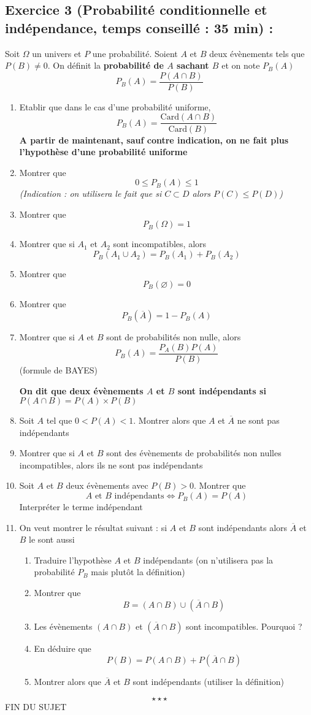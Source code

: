 \subsection*{Exercice 3 (Probabilité conditionnelle et indépendance, temps conseillé : 35 min) : }
Soit $\Omega$ un univers et $P$ une probabilité. Soient $A$ et $B$ deux évènements tels que $P(B) \neq 0$. On définit la \textbf{probabilité de $A$ sachant $B$} et on note $P_B(A)$ 
$$P_B(A) = \frac{P(A\cap B)}{P(B)}$$
\begin{enumerate}
\item Etablir que dans le cas d'une probabilité uniforme, 
$$P_B(A) = \frac{\text{Card}(A\cap B)}{\text{Card}(B)}$$
\textbf{A partir de maintenant, sauf contre indication, on ne fait plus l'hypothèse d'une probabilité uniforme}
\item Montrer que 
$$0 \leq P_B(A) \leq 1$$
\emph{(Indication : on utilisera le fait que si $C \subset D$ alors $P(C) \leq P(D)$)}
\item Montrer que $$P_B(\Omega) = 1$$
\item Montrer que si $A_1$ et $A_2$ sont incompatibles, alors $$P_B(A_1 \cup A_2) = P_B(A_1) + P_B(A_2)$$
\item Montrer que $$P_B(\varnothing) = 0$$
\item Montrer que $$P_B(\overline{A}) = 1 - P_B(A)$$
\item Montrer que si $A$ et $B$ sont de probabilités non nulle, alors 
$$P_B(A) = \frac{P_A(B)P(A)}{P(B)}$$
(formule de BAYES)\newline


\textbf{On dit que deux évènements $A$ et $B$ sont indépendants si $P(A\cap B) = P(A) \times P(B)$}
\item Soit $A$ tel que $0 < P(A) < 1$. Montrer alors que $A$ et $\overline{A}$ ne sont pas indépendants
\item Montrer que si $A$ et $B$ sont des évènements de probabilités non nulles incompatibles, alors ils ne sont pas indépendants
\item Soit $A$ et $B$ deux évènements avec $P(B) > 0$. Montrer que 
$$A \text{ et } B \text{ indépendants} \Leftrightarrow P_B(A) = P(A)$$
Interpréter le terme indépendant
\item On veut montrer le résultat suivant : si $A$ et $B$ sont indépendants alors $\overline{A}$ et $B$ le sont aussi
\begin{enumerate}
\item Traduire l'hypothèse $A$ et $B$ indépendants (on n'utilisera pas la probabilité $P_B$ mais plutôt la définition)
\item Montrer que 
$$B = (A \cap B) \cup (\overline{A} \cap B)$$
\item Les évènements $(A \cap B)$ et $(\overline{A} \cap B)$ sont incompatibles. Pourquoi ?
\item En déduire que $$P(B) = P(A \cap B) + P(\overline{A} \cap B)$$
\item Montrer alors que $\overline{A}$ et $B$ sont indépendants (utiliser la définition)
\end{enumerate}
\end{enumerate}
$$\star \star \star$$
\center
FIN DU SUJET
